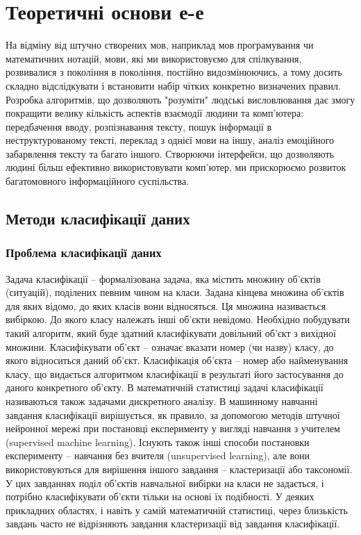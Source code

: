 \section{Теоретичні основи е-е}
На відміну від штучно створених мов, наприклад мов програмування чи математичних нотацій,
мови, які ми використовуємо для спілкування, розвивалися з покоління в покоління, постійно
видозмінюючись, а тому досить складно відслідкувати і встановити набір чітких конкретно
визначених правил. Розробка алгоритмів, що дозволяють "розуміти" людські висловлювання
дає змогу покращити велику кількість аспектів взаємодії людини та комп'ютера: передбачення
вводу, розпізнавання тексту, пошук інформації в неструктурованому тексті, переклад з однієї
мови на іншу, аналіз емоційного забарвлення тексту та багато іншого. Створюючи інтерфейси,
що дозволяють людині більш ефективно використовувати комп'ютер, ми прискорюємо
розвиток багатомовного інформаційного суспільства.

\subsection{Методи класифікації даних}

\subsubsection{Проблема класифікації даних}
Задача класифікації – формалізована задача, яка містить множину об’єктів (ситуацій), поділених певним чином на класи. Задана кінцева множина об'єктів для яких відомо, до яких класів вони відносяться. Ця множина називається вибіркою. До якого класу належать інші об'єкти невідомо. Необхідно побудувати такий алгоритм, який буде здатний класифікувати довільний об'єкт з вихідної множини.
Класифікувати об'єкт – означає вказати номер (чи назву) класу, до якого відноситься даний об'єкт.
Класифікація об'єкта – номер або найменування класу, що видається алгоритмом класифікації в результаті його застосування до даного конкретного об'єкту.
В математичній статистиці задачі класифікації називаються також задачами дискретного аналізу. В машинному навчанні завдання класифікації вирішується, як правило, за допомогою методів штучної нейронної мережі при постановці експерименту у вигляді навчання з учителем (supervised machine learning).
Існують також інші способи постановки експерименту – навчання без вчителя (unsupervised learning), але вони використовуються для вирішення іншого завдання – кластеризації або таксономії. У цих завданнях поділ об'єктів навчальної вибірки на класи не задається, і потрібно класифікувати об'єкти тільки на основі їх подібності. У деяких прикладних областях, і навіть у самій математичній статистиці, через близькість завдань часто не відрізняють завдання кластеризації від завдання класифікації.

